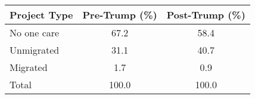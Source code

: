 \begin{tabular}{lcc}
\toprule
Project Type & Pre-Trump (\%) & Post-Trump (\%) \\
\midrule
No one care & 67.2 & 58.4 \\
Unmigrated & 31.1 & 40.7 \\
Migrated & 1.7 & 0.9 \\
\midrule
Total & 100.0 & 100.0 \\
\bottomrule
\end{tabular}